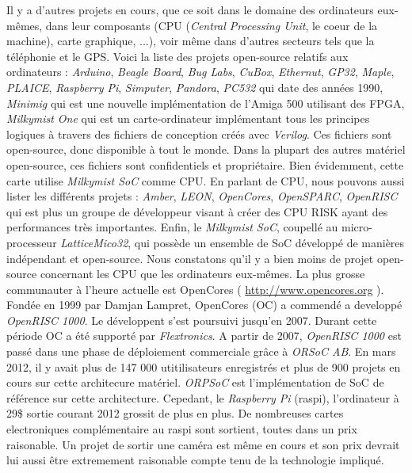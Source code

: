 Il y a d'autres projets en cours, que ce soit dans le domaine des ordinateurs eux-mêmes, dans leur composants (CPU (\textit{Central Processing Unit}, le coeur de la machine), carte graphique, ...), voir même dans d'autres secteurs tels que la téléphonie et le GPS. Voici la liste des projets open-source relatifs aux ordinateurs : \textit{Arduino}, \textit{Beagle Board}, \textit{Bug Labs}, \textit{CuBox}, \textit{Ethernut}, \textit{GP32}, \textit{Maple}, \textit{PLAICE}, \textit{Raspberry Pi}, \textit{Simputer}, \textit{Pandora}, \textit{PC532} qui date des années 1990, \textit{Minimig} qui est une nouvelle implémentation de l'Amiga 500 utilisant des FPGA, \textit{Milkymist One} qui est un carte-ordinateur implémentant tous les principes logiques à travers des fichiers de conception créés avec \textit{Verilog}. Ces fichiers sont open-source, donc disponible à tout le monde. Dans la plupart des autres matériel open-source, ces fichiers sont confidentiels et propriétaire. Bien évidemment, cette carte utilise \textit{Milkymist SoC} comme CPU.
\medskip
En parlant de CPU, nous pouvons aussi lister les différents projets : \textit{Amber}, \textit{LEON}, \textit{OpenCores}, \textit{OpenSPARC}, \textit{OpenRISC} qui est plus un groupe de développeur visant à créer des CPU RISK ayant des performances très importantes. Enfin, le \textit{Milkymist SoC}, coupellé au micro-processeur \textit{LatticeMico32}, qui possède un ensemble de SoC développé de manières indépendant et open-source. Nous constatons qu'il y a bien moins de projet open-source concernant les CPU que les ordinateurs eux-mêmes.
\medskip
La plus grosse communauter à l'heure actuelle est OpenCores ( \url{http://www.opencores.org} ). Fondée en 1999 par Damjan Lampret, OpenCores (OC) a commendé a developpé \textit{OpenRISC 1000}. Le développent s'est poursuivi jusqu'en 2007. Durant cette période OC a été supporté par \textit{Flextronics}. A partir de 2007, \textit{OpenRISC 1000} est passé dans une phase de déploiement commerciale grâce à \textit{ORSoC AB}. En mars 2012, il y avait plus de 147 000 utitilisateurs enregistrés et plus de 900 projets en cours sur cette architecure matériel. \textit{ORPSoC} est l'implémentation de SoC de référence sur cette architecture. Cepedant, le \textit{Raspberry Pi} (raspi), l'ordinateur à 29\$ sortie courant 2012 grossit de plus en plus. De nombreuses cartes electroniques complémentaire au raspi sont sortient, toutes dans un prix raisonable. Un projet de sortir une caméra est même en cours et son prix devrait lui aussi être extremement raisonable compte tenu de la technologie impliqué. 
